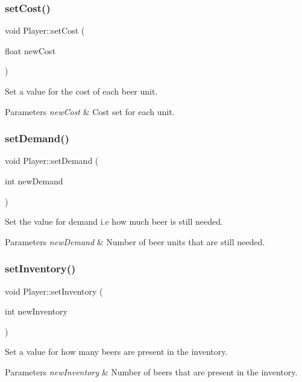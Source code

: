 \subsubsection{\texorpdfstring{set\+Cost()}{setCost()}}
{\footnotesize\ttfamily void Player\+::set\+Cost (\begin{DoxyParamCaption}\item[{float}]{new\+Cost }\end{DoxyParamCaption})}

Set a value for the cost of each beer unit. 
\begin{DoxyParams}{Parameters}
{\em new\+Cost} & Cost set for each unit. \\
\hline
\end{DoxyParams}
\mbox{\label{classPlayer_a8dc0985588eeb8785a6cda41dfc496a9}} 
\subsubsection{\texorpdfstring{set\+Demand()}{setDemand()}}
{\footnotesize\ttfamily void Player\+::set\+Demand (\begin{DoxyParamCaption}\item[{int}]{new\+Demand }\end{DoxyParamCaption})}

Set the value for demand i.\+e how much beer is still needed. 
\begin{DoxyParams}{Parameters}
{\em new\+Demand} & Number of beer units that are still needed. \\
\hline
\end{DoxyParams}
\mbox{\label{classPlayer_a1f305ca526f8d5665fc3778cfdd10af1}} 
\subsubsection{\texorpdfstring{set\+Inventory()}{setInventory()}}
{\footnotesize\ttfamily void Player\+::set\+Inventory (\begin{DoxyParamCaption}\item[{int}]{new\+Inventory }\end{DoxyParamCaption})}

Set a value for how many beers are present in the inventory. 
\begin{DoxyParams}{Parameters}
{\em new\+Inventory} & Number of beers that are present in the inventory. \\
\hline
\end{DoxyParams}
\mbox{\label{classPlayer_a8823e72be11b1ab41620eafedf1a28e3}} 
